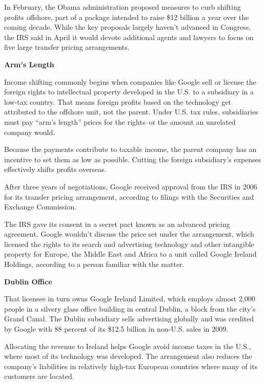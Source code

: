 \begin{select}
In February, the Obama administration proposed measures to curb shifting profits offshore, part of a package intended to raise \$12 billion a year over the coming decade. While the key proposals largely haven't advanced in Congress, the IRS said in April it would devote additional agents and lawyers to focus on five large transfer pricing arrangements.

\begin{center} \textbf{Arm's Length}
\end{center}

Income shifting commonly begins when companies like Google sell or license the foreign rights to intellectual property developed in the U.S. to a subsidiary in a low-tax country. That means foreign profits based on the technology get attributed to the offshore unit, not the parent. Under U.S. tax rules, subsidiaries must pay ``arm's length'' prices for the rights--or the amount an unrelated company would.

Because the payments contribute to taxable income, the parent company has an incentive to set them as low as possible. Cutting the foreign subsidiary's expenses effectively shifts profits overseas.

After three years of negotiations, Google received approval from the IRS in 2006 for its transfer pricing arrangement, according to filings with the Securities and Exchange Commission.

The IRS gave its consent in a secret pact known as an advanced pricing agreement. Google wouldn't discuss the price set under the arrangement, which licensed the rights to its search and advertising technology and other intangible property for Europe, the Middle East and Africa to a unit called Google Ireland Holdings, according to a person familiar with the matter.

\begin{center} \textbf{Dublin Office}
\end{center}

That licensee in turn owns Google Ireland Limited, which employs almost 2,000 people in a silvery glass office building in central Dublin, a block from the city's Grand Canal. The Dublin subsidiary sells advertising globally and was credited by Google with 88 percent of its \$12.5 billion in non-U.S. sales in 2009.

Allocating the revenue to Ireland helps Google avoid income taxes in the U.S., where most of its technology was developed. The arrangement also reduces the company's liabilities in relatively high-tax European countries where many of its customers are located.


\end{select}
